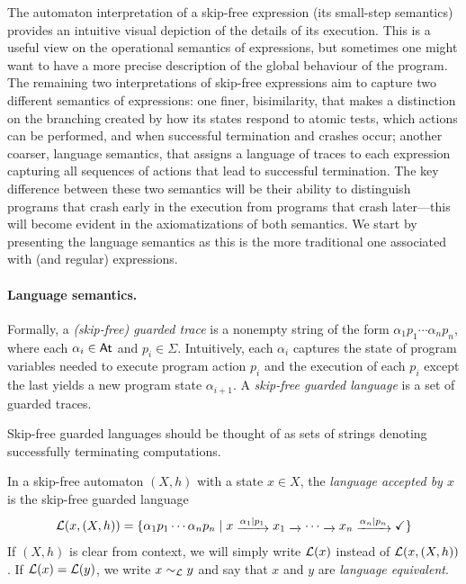 \documentclass[orivec,envcountsect,envcountsame]{llncs}
\begin{document}
    The automaton interpretation of a skip-free  \GKAT expression (its small-step semantics) provides an intuitive visual depiction of the details of its execution. This is a useful view on the operational semantics of expressions, but sometimes one might want to have a more precise description of the global behaviour of the program.   The remaining two interpretations of skip-free  \GKAT expressions aim to capture two different semantics of expressions: one finer, bisimilarity, that makes a distinction on the branching created by how its states respond to atomic tests, which actions can be performed, and when successful termination and crashes occur; another coarser, language semantics, that assigns a language of traces to each expression capturing all sequences of actions that lead to successful termination. The key difference between these two semantics will be their ability to distinguish programs that crash early in the execution from programs that crash later---this will become evident in the axiomatizations of both semantics. We start by presenting the language semantics as this is the more traditional one associated with \GKAT (and regular) expressions.

     \paragraph{\bf Language semantics.}
    Formally, a \emph{(skip-free) guarded trace} is a nonempty string of the form \(\alpha_1p_1 \cdots \alpha_n p_n\), where each \(\alpha_i \in \mathsf{At}\) and \(p_i \in \Sigma\). Intuitively, each $\alpha_i$ captures the state of program variables needed to execute program action $p_i$ and the execution of each $p_i$ except the last yields a new program state $\alpha_{i+1}$.
    A \emph{skip-free guarded language} is a set of guarded traces.

    Skip-free guarded languages should be thought of as sets of strings denoting successfully terminating computations.

    \begin{definition}
        In a skip-free automaton  \((X, h)\) with a state \(x \in X\), the \emph{language accepted by \(x\)} is the skip-free guarded language
        \[
            \L(x, (X, h)) = \{\alpha_1p_1\cdots \alpha_{n}p_n \mid x \tr{\alpha_1 \mid p_1} x_1 \tr{} \cdots \tr{} x_n \tr{\alpha_n \mid p_n} \checkmark\}
        \]
        If \((X, h)\) is clear from context, we will simply write \(\mathcal{L}(x)\) instead of \(\mathcal{L}(x, (X, h))\).
        If \(\mathcal{L}(x) = \mathcal{L}(y)\), we write \(x \sim_{\mathcal{L}} y\) and say that \(x\) and \(y\) are \emph{language equivalent}.
    \end{definition}
\end{document}
